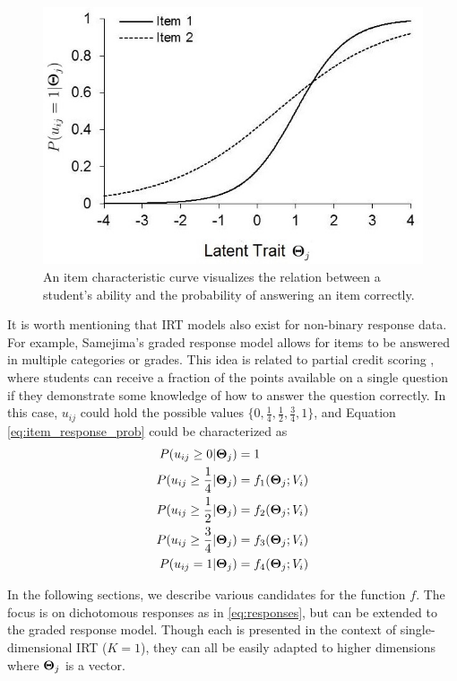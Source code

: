 \begin{figure}[h]
  \centering
  \includegraphics[width=.6\textwidth]{img/logistic_2param_icc.jpg}
  \caption{An item characteristic curve visualizes the relation between a student's ability and the probability of answering an item correctly.}
  \label{fig:icc}
\end{figure}

It is worth mentioning that IRT models also exist for non-binary response data. For example, Samejima's graded response model \cite{samejima1997} allows for items to be answered in multiple categories or grades. This idea is related to partial credit scoring \cite{masters1982}, where students can receive a fraction of the points available on a single question if they demonstrate some knowledge of how to answer the question correctly. In this case, $u_{ij}$ could hold the possible values $\{0, \frac{1}{4}, \frac{1}{2}, \frac{3}{4}, 1\}$, and Equation \ref{eq:item_response_prob} could be characterized as 
\begin{equation}
\begin{split}
  P(u_{ij} \geq 0 | \boldsymbol{\Theta}_j) &= 1 \\
  P(u_{ij} \geq \frac{1}{4} | \boldsymbol{\Theta}_j) &= f_1(\boldsymbol{\Theta}_j;V_i) \\
P(u_{ij} \geq \frac{1}{2} | \boldsymbol{\Theta}_j) &= f_2(\boldsymbol{\Theta}_j;V_i) \\
P(u_{ij} \geq \frac{3}{4} | \boldsymbol{\Theta}_j) &= f_3(\boldsymbol{\Theta}_j;V_i) \\
P(u_{ij} = 1 | \boldsymbol{\Theta}_j) &= f_4(\boldsymbol{\Theta}_j;V_i) 
\end{split}
  \label{eq:graded_response_prob}
\end{equation}

In the following sections, we describe various candidates for the function $f$. The focus is on dichotomous responses as in \ref{eq:responses}, but can be extended to the graded response model. Though each is presented in the context of single-dimensional IRT ($K = 1$), they can all be easily adapted to higher dimensions where $\boldsymbol{\Theta}_j$ is a vector.

